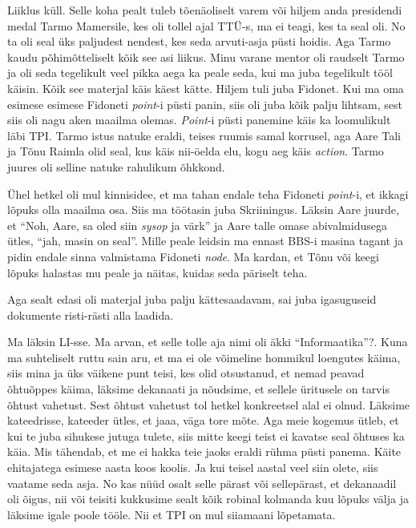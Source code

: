 Liiklus küll. Selle koha pealt tuleb tõenäoliselt varem või hiljem anda
presidendi medal Tarmo Mamersile, kes oli tollel ajal 
TTÜ-s, ma ei teagi, kes ta seal oli. No ta oli 
seal üks paljudest nendest, kes seda arvuti-asja püsti hoidis. Aga 
Tarmo kaudu põhimõtteliselt kõik see asi liikus. Minu varane mentor oli 
raudselt Tarmo ja oli seda tegelikult veel pikka aega ka peale seda, kui ma 
juba tegelikult tööl käisin. Kõik see materjal käis käest kätte. Hiljem tuli 
juba Fidonet. Kui ma oma esimese esimese Fidoneti \emph{point}-i 
püsti panin, siis oli juba kõik palju lihtsam, sest siis oli nagu aken maailma 
olemas. \emph{Point}-i püsti panemine käis ka loomulikult läbi TPI. Tarmo 
istus natuke eraldi, teises ruumis samal korrusel, aga  
Aare Tali\label{sisu!aare_tali} ja Tõnu Raimla olid 
seal, kus käis nii-öelda elu, kogu aeg käis \emph{action}. Tarmo juures oli selline natuke rahulikum 
õhkkond. 

Ühel  
hetkel oli mul kinnisidee, et ma tahan endale teha Fidoneti \emph{point}-i, et 
ikkagi lõpuks olla maailma osa. Siis ma töötasin juba 
Skriiningus. Läksin Aare juurde, et \enquote{Noh, Aare, 
sa oled siin \emph{sysop} ja värk} ja Aare talle omase abivalmidusega ütles, 
\enquote{jah, masin on seal}. Mille peale leidsin ma ennast BBS-i masina tagant ja pidin 
endale sinna valmistama Fidoneti \emph{node}. Ma kardan, et Tõnu või keegi 
lõpuks halastas mu peale ja näitas, kuidas seda päriselt teha. 

Aga sealt edasi oli materjal juba palju kättesaadavam, sai juba  
igasuguseid dokumente risti-rästi alla laadida. 


Ma läksin LI-sse. Ma arvan, et selle tolle aja nimi oli äkki \enquote{Informaatika}?. 
Kuna ma suhteliselt ruttu sain aru, et ma ei ole võimeline hommikul loengutes 
käima, siis mina ja üks väikene punt teisi, kes olid otsustanud, et nemad 
peavad õhtuõppes käima, läksime dekanaati ja nõudsime, et sellele üritusele on tarvis õhtust vahetust. Sest  õhtust vahetust tol hetkel konkreetsel alal 
ei olnud. Läksime kateedrisse, kateeder ütles, et jaaa, väga tore mõte. Aga 
meie kogemus ütleb, et kui te juba sihukese jutuga tulete, siis mitte keegi 
teist ei kavatse seal õhtuses ka käia. Mis tähendab, et me ei hakka teie jaoks  
eraldi rühma püsti panema. Käite ehitajatega esimese aasta koos koolis. Ja kui 
teisel aastal veel siin olete, siis vaatame seda asja. No kas nüüd osalt selle 
pärast või sellepärast, et dekanaadil oli õigus, nii või teisiti kukkusime 
sealt kõik robinal kolmanda kuu lõpuks välja ja läksime igale poole tööle. Nii 
et TPI on mul siiamaani lõpetamata. 

